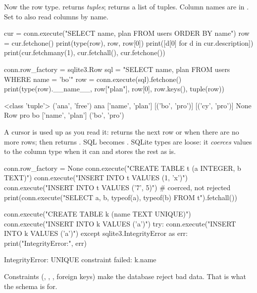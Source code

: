 Now the row type.  returns \emph{tuples};  returns a list of
tuples. Column names are in . Set
 to also read columns by name.

\begin{pycode}
cur = conn.execute("SELECT name, plan FROM users ORDER BY name")
row = cur.fetchone()
print(type(row), row, row[0])
print([d[0] for d in cur.description])
print(cur.fetchmany(1), cur.fetchall(), cur.fetchone())

conn.row_factory = sqlite3.Row
sql = "SELECT name, plan FROM users WHERE name = 'bo'"
row = conn.execute(sql).fetchone()
print(type(row).__name__, row["plan"], row[0], row.keys(), tuple(row))
\end{pycode}
\begin{rawcode}
<class 'tuple'> ('ana', 'free') ana
['name', 'plan']
[('bo', 'pro')] [('cy', 'pro')] None
Row pro bo ['name', 'plan'] ('bo', 'pro')
\end{rawcode}

\begin{typecheck}
A cursor is used up as you read it:  returns the next row or  when
there are no more rows;  then returns \code{[]}. SQL  becomes
. SQLite types are loose: it \emph{coerces} values to the column type when it
can and stores the rest as is.
\end{typecheck}

\begin{pycode}
conn.row_factory = None
conn.execute("CREATE TABLE t (a INTEGER, b TEXT)")
conn.execute("INSERT INTO t VALUES (1, 'x')")
conn.execute("INSERT INTO t VALUES ('7', 5)")        # coerced, not rejected
print(conn.execute("SELECT a, b, typeof(a), typeof(b) FROM t").fetchall())

conn.execute("CREATE TABLE k (name TEXT UNIQUE)")
conn.execute("INSERT INTO k VALUES ('a')")
try:
    conn.execute("INSERT INTO k VALUES ('a')")
except sqlite3.IntegrityError as err:
    print("IntegrityError:", err)
\end{pycode}
\begin{rawcode}
IntegrityError: UNIQUE constraint failed: k.name
\end{rawcode}

Constraints (, , , foreign keys) make the
database reject bad data. That is what the schema is for.


